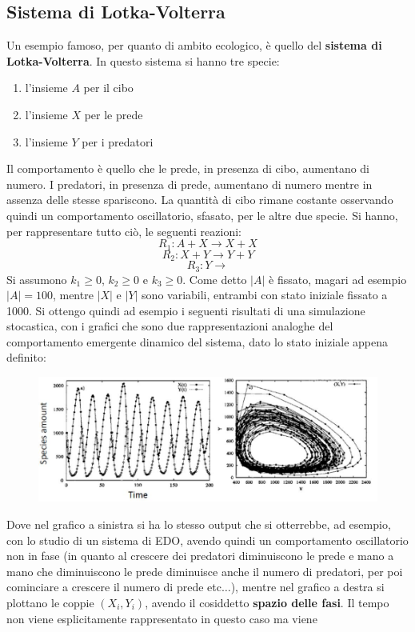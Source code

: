 \documentclass[a4paper,12pt, oneside]{book}
\begin{document}
\subsection{Sistema di Lotka-Volterra}
Un esempio famoso, per quanto di ambito ecologico, è quello del \textbf{sistema
  di Lotka-Volterra}. In questo sistema si hanno tre specie:
\begin{enumerate}
  \item l'insieme $A$ per il cibo
  \item l'insieme $X$ per le prede
  \item l'insieme $Y$ per i predatori
\end{enumerate}
Il comportamento è quello che le prede, in presenza di cibo, aumentano di
numero. I predatori, in presenza di prede, aumentano di numero mentre in assenza
delle stesse spariscono. La quantità di cibo rimane costante osservando quindi
un comportamento oscillatorio, sfasato, per le altre due specie. Si hanno, per
rappresentare tutto ciò, le seguenti reazioni:
\[R_1:A+X\to X+X\]
\[R_2:X+Y\to Y+Y\]
\[R_3:Y\to\]
Si assumono $k_1\geq 0$, $k_2\geq 0$ e $k_3\geq 0$. Come detto $|A|$ è fissato,
magari ad esempio $|A|=100$, mentre $|X|$ e $|Y|$ sono variabili, entrambi con
stato iniziale fissato a 1000. Si ottengo quindi ad esempio i seguenti
risultati di una simulazione stocastica, con i grafici che sono due
rappresentazioni analoghe del 
comportamento emergente dinamico del sistema, dato lo stato iniziale appena
definito: 
\begin{figure}[H]
  \centering
  \includegraphics[scale = 0.4]{img/volt.jpg}
\end{figure}
Dove nel grafico a sinistra si ha lo stesso output che si otterrebbe, ad
esempio, con lo studio di un sistema di EDO, avendo quindi un comportamento
oscillatorio non in fase (in quanto al crescere dei predatori diminuiscono le
prede e mano a mano che diminuiscono le prede diminuisce anche il numero di
predatori, per poi cominciare a crescere il numero di prede etc$\ldots$), mentre
nel grafico a destra si 
plottano le coppie $(X_i, Y_i)$, avendo il cosiddetto \textbf{spazio delle
  fasi}. Il tempo non viene esplicitamente rappresentato in questo caso ma viene
\end{document}
